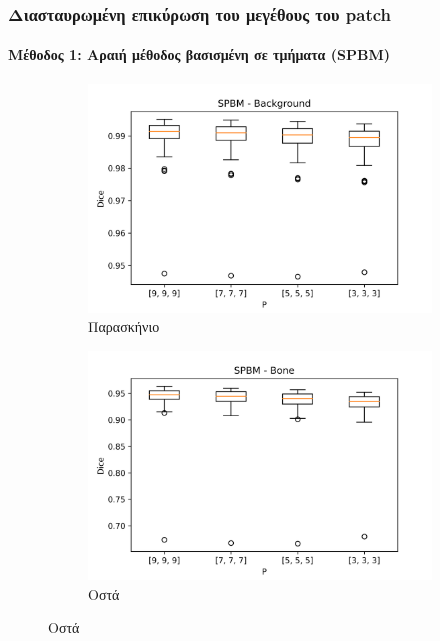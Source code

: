 \documentclass{beamer}
\begin{document}
\begin{frame}
\frametitle{Διασταυρωμένη επικύρωση του μεγέθους του patch}
\framesubtitle{Μέθοδος 1: Αραιή μέθοδος βασισμένη σε τμήματα (SPBM)}

\begin{figure}[H]
    \centering

    \begin{subfigure}[b]{0.42\linewidth}
    \includegraphics[width=\linewidth]{SPBM_P_Background_plot.png}
    \caption{Παρασκήνιο}
    \end{subfigure}
    \begin{subfigure}[b]{0.42\linewidth}
    \includegraphics[width=\linewidth]{SPBM_P_Bone_plot.png}
    \caption{Οστά}
    \end{subfigure}


\end{figure}
\end{frame}
\end{document}
